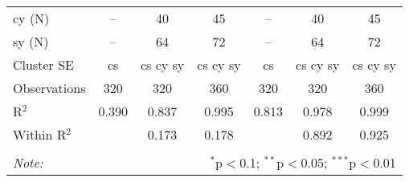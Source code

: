 \documentclass[a4paper]{article}
\begin{document}
\begin{table}[h!]
{\begin{tabular}[t]{lcccccc}
cy (N) & -- & 40 & 45 & -- & 40 & 45\\
sy (N) & -- & 64 & 72 & -- & 64 & 72\\
\midrule
Cluster SE & cs & cs cy sy & cs cy sy & cs & cs cy sy & cs cy sy\\
Observations & 320&320&360&320&320&360\\
R$^2$ & 0.390 & 0.837 & 0.995 & 0.813 & 0.978 & 0.999 \\
Within R$^2$ & & 0.173 & 0.178 & & 0.892 & 0.925 \\ \bottomrule \\[-1em]
\textit{Note:}  & \multicolumn{6}{r}{$^{*}$p$<$0.1; $^{**}$p$<$0.05; $^{***}$p$<$0.01} \\ 
\end{tabular}
}
\end{table}
\FloatBarrier
\end{document}
